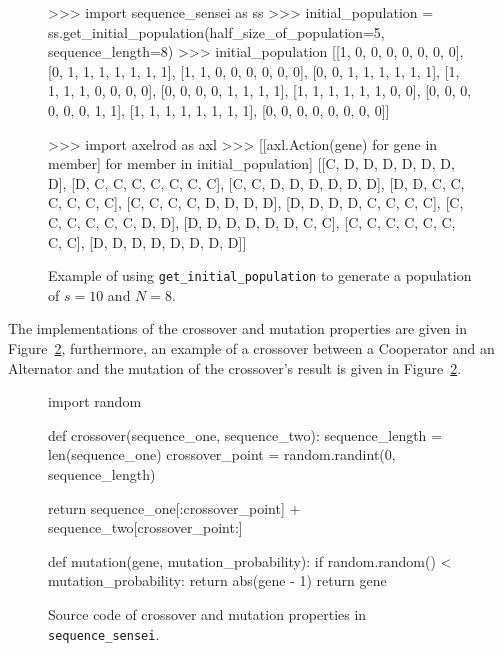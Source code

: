 \begin{figure}[!htbp]
    \begin{usagepy}
>>> import sequence_sensei as ss
>>> initial_population = ss.get_initial_population(half_size_of_population=5, sequence_length=8)
>>> initial_population
[[1, 0, 0, 0, 0, 0, 0, 0],
 [0, 1, 1, 1, 1, 1, 1, 1],
 [1, 1, 0, 0, 0, 0, 0, 0],
 [0, 0, 1, 1, 1, 1, 1, 1],
 [1, 1, 1, 1, 0, 0, 0, 0],
 [0, 0, 0, 0, 1, 1, 1, 1],
 [1, 1, 1, 1, 1, 1, 0, 0],
 [0, 0, 0, 0, 0, 0, 1, 1],
 [1, 1, 1, 1, 1, 1, 1, 1],
 [0, 0, 0, 0, 0, 0, 0, 0]]

 >>> import axelrod as axl
 >>> [[axl.Action(gene) for gene in member] for member in initial_population]
[[C, D, D, D, D, D, D, D],
 [D, C, C, C, C, C, C, C],
 [C, C, D, D, D, D, D, D],
 [D, D, C, C, C, C, C, C],
 [C, C, C, C, D, D, D, D],
 [D, D, D, D, C, C, C, C],
 [C, C, C, C, C, C, D, D],
 [D, D, D, D, D, D, C, C],
 [C, C, C, C, C, C, C, C],
 [D, D, D, D, D, D, D, D]]
    \end{usagepy}
    \caption{Example of using \texttt{get_initial_population} to
    generate a population of \(s=10\) and \(N=8\).}\label{fig:get_initial_population_example}
\end{figure}

The implementations of the crossover and mutation properties are given in Figure~\ref{fig:crossover_mutation},
furthermore, an example of a crossover between a Cooperator and an Alternator and the
mutation of the crossover's result is given in Figure~\ref{fig:crossover_mutation}.

\begin{figure}[!htbp]
\begin{sourcepy}
import random

def crossover(sequence_one, sequence_two):
    sequence_length = len(sequence_one)
    crossover_point = random.randint(0, sequence_length)

    return sequence_one[:crossover_point] + sequence_two[crossover_point:]

def mutation(gene, mutation_probability):
    if random.random() < mutation_probability:
        return abs(gene - 1)
    return gene
\end{sourcepy}
\caption{Source code of crossover and mutation properties in \texttt{sequence_sensei}.}\label{fig:crossover_mutation}
\end{figure}

